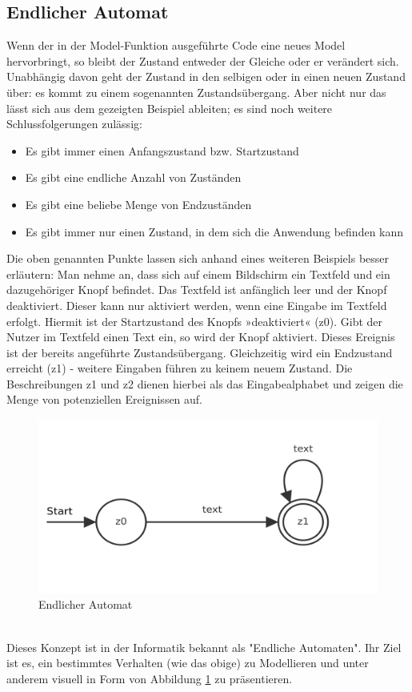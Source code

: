 \subsection{Endlicher Automat}
Wenn der in der Model-Funktion ausgeführte Code eine neues Model hervorbringt, so bleibt der Zustand entweder der Gleiche oder er verändert sich. Unabhängig davon geht der Zustand in den selbigen oder in einen neuen Zustand über: es kommt zu einem sogenannten Zustandsübergang. Aber nicht nur das lässt sich aus dem gezeigten Beispiel ableiten; es sind noch weitere Schlussfolgerungen zulässig:
\\
\begin{itemize}
	\item Es gibt immer einen Anfangszustand bzw. Startzustand
	\item Es gibt eine endliche Anzahl von Zuständen
	\item Es gibt eine beliebe Menge von Endzuständen
	\item Es gibt immer nur einen Zustand, in dem sich die Anwendung befinden kann
\end{itemize}
\bigskip
Die oben genannten Punkte lassen sich anhand eines weiteren Beispiels besser erläutern: Man nehme an, dass sich auf einem Bildschirm ein Textfeld und ein dazugehöriger Knopf befindet. Das Textfeld ist anfänglich leer und der Knopf deaktiviert. Dieser kann nur aktiviert werden, wenn eine Eingabe im Textfeld erfolgt. Hiermit ist der Startzustand des Knopfs »deaktiviert« (z0). Gibt der Nutzer im Textfeld einen Text ein, so wird der Knopf aktiviert. Dieses Ereignis ist der bereits angeführte Zustandsübergang.
Gleichzeitig wird ein Endzustand erreicht (z1) - weitere Eingaben führen zu keinem neuem Zustand.
Die Beschreibungen z1 und z2 dienen hierbei als das Eingabealphabet und zeigen die Menge von potenziellen Ereignissen auf.
\begin{figure}[ht]
	\centering
	\includegraphics[height=0.35\textwidth]{./images/out}
	\caption{Endlicher Automat}
	\label{fig:endlicherAutomat}
\end{figure}
\\
Dieses Konzept ist in der Informatik bekannt als "Endliche Automaten". Ihr Ziel ist es, ein bestimmtes Verhalten (wie das obige) zu Modellieren und unter anderem visuell in Form von Abbildung
\ref{fig:endlicherAutomat} 
zu präsentieren.